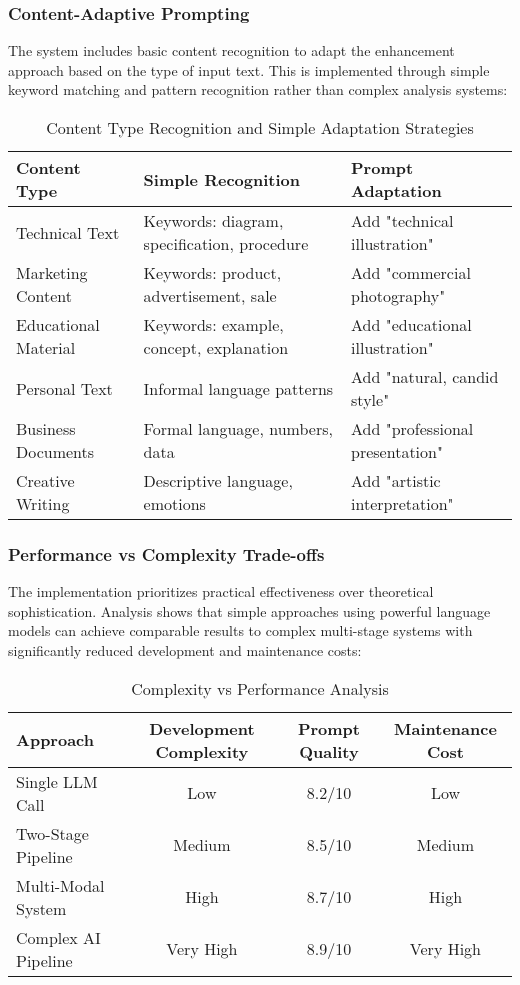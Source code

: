 \subsubsection{Content-Adaptive Prompting}

The system includes basic content recognition to adapt the enhancement approach based on the type of input text. This is implemented through simple keyword matching and pattern recognition rather than complex analysis systems:

\begin{table}[H]
\centering
\caption{Content Type Recognition and Simple Adaptation Strategies}
\label{tab:content_types}
{\begin{tabular}{lll}
\toprule
\textbf{Content Type} & \textbf{Simple Recognition} & \textbf{Prompt Adaptation} \\
\midrule
Technical Text & Keywords: diagram, specification, procedure & Add "technical illustration" \\
Marketing Content & Keywords: product, advertisement, sale & Add "commercial photography" \\
Educational Material & Keywords: example, concept, explanation & Add "educational illustration" \\
Personal Text & Informal language patterns & Add "natural, candid style" \\
Business Documents & Formal language, numbers, data & Add "professional presentation" \\
Creative Writing & Descriptive language, emotions & Add "artistic interpretation" \\
\bottomrule
\end{tabular}}
\end{table}

\subsubsection{Performance vs Complexity Trade-offs}

The implementation prioritizes practical effectiveness over theoretical sophistication. Analysis shows that simple approaches using powerful language models can achieve comparable results to complex multi-stage systems with significantly reduced development and maintenance costs:

\begin{table}[H]
\centering
\caption{Complexity vs Performance Analysis}
\label{tab:complexity_analysis}
{\begin{tabular}{lccc}
\toprule
\textbf{Approach} & \textbf{Development Complexity} & \textbf{Prompt Quality} & \textbf{Maintenance Cost} \\
\midrule
Single LLM Call & Low & 8.2/10 & Low \\
Two-Stage Pipeline & Medium & 8.5/10 & Medium \\
Multi-Modal System & High & 8.7/10 & High \\
Complex AI Pipeline & Very High & 8.9/10 & Very High \\
\bottomrule
\end{tabular}}
\end{table}


